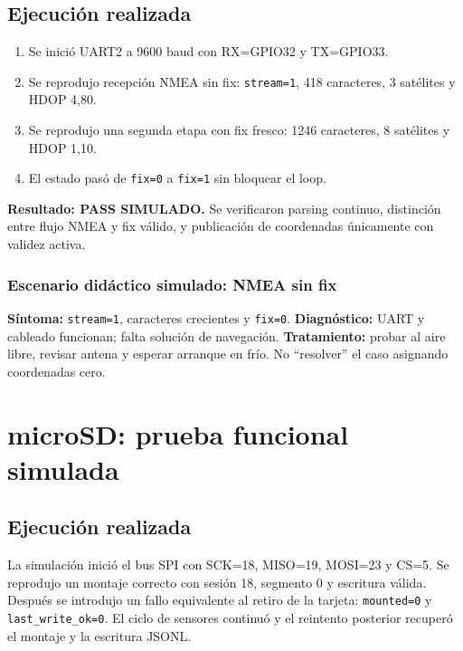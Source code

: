 \documentclass[11pt,a4paper,oneside]{report}
\begin{document}
\section{Ejecución realizada}
\begin{vssimtest}
\begin{enumerate}
  \item Se inició UART2 a 9600 baud con RX=GPIO32 y TX=GPIO33.
  \item Se reprodujo recepción NMEA sin fix: \texttt{stream=1}, 418 caracteres,
  3 satélites y HDOP 4,80.
  \item Se reprodujo una segunda etapa con fix fresco: 1246 caracteres,
  8 satélites y HDOP 1,10.
  \item El estado pasó de \texttt{fix=0} a \texttt{fix=1} sin bloquear el loop.
\end{enumerate}
\textbf{Resultado: PASS SIMULADO.} Se verificaron parsing continuo, distinción entre
flujo NMEA y fix válido, y publicación de coordenadas únicamente con validez activa.
\end{vssimtest}


\subsection*{Escenario didáctico simulado: NMEA sin fix}
\textbf{Síntoma:} \texttt{stream=1}, caracteres crecientes y \texttt{fix=0}. 
\textbf{Diagnóstico:} UART y cableado funcionan; falta solución de navegación.
\textbf{Tratamiento:} probar al aire libre, revisar antena y esperar arranque en frío.
No ``resolver'' el caso asignando coordenadas cero.

\chapter{microSD: prueba funcional simulada}

\section{Ejecución realizada}
La simulación inició el bus SPI con SCK=18, MISO=19, MOSI=23 y CS=5. Se reprodujo un
montaje correcto con sesión 18, segmento 0 y escritura válida. Después se introdujo
un fallo equivalente al retiro de la tarjeta: \texttt{mounted=0} y
\texttt{last\_write\_ok=0}. El ciclo de sensores continuó y el reintento posterior
recuperó el montaje y la escritura JSONL.
\end{document}
